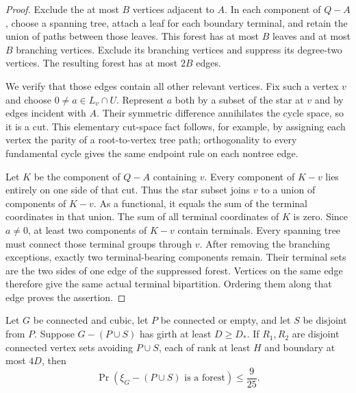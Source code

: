 \begin{proof}
Exclude the at most $B$ vertices adjacent to $A$.
In each component of $Q-A$, choose a spanning tree, attach a leaf for each boundary terminal, and retain the union of paths between those leaves.
This forest has at most $B$ leaves and at most $B$ branching vertices.
Exclude its branching vertices and suppress its degree-two vertices.
The resulting forest has at most $2B$ edges.

We verify that those edges contain all other relevant vertices.
Fix such a vertex $v$ and choose $0\ne a\in L_v\cap U$.
Represent $a$ both by a subset of the star at $v$ and by edges incident with $A$.
Their symmetric difference annihilates the cycle space, so it is a cut.
This elementary cut-space fact follows, for example, by assigning each vertex the parity of a root-to-vertex tree path; orthogonality to every fundamental cycle gives the same endpoint rule on each nontree edge.

Let $K$ be the component of $Q-A$ containing $v$.
Every component of $K-v$ lies entirely on one side of that cut.
Thus the star subset joins $v$ to a union of components of $K-v$.
As a functional, it equals the sum of the terminal coordinates in that union.
The sum of all terminal coordinates of $K$ is zero.
Since $a\ne0$, at least two components of $K-v$ contain terminals.
Every spanning tree must connect those terminal groups through $v$.
After removing the branching exceptions, exactly two terminal-bearing components remain.
Their terminal sets are the two sides of one edge of the suppressed forest.
Vertices on the same edge therefore give the same actual terminal bipartition.
Ordering them along that edge proves the assertion.
\end{proof}

\begin{lemma}
\label{lem:four-two-clean-regions}
Let $G$ be connected and cubic, let $P$ be connected or empty, and let $S$ be disjoint from $P$.
Suppose $G-(P\cup S)$ has girth at least $D\ge D_*$.
If $R_1,R_2$ are disjoint connected vertex sets avoiding $P\cup S$, each of rank at least $H$ and boundary at most $4D$, then
\[
 \Pr(\xi_G-(P\cup S)\text{ is a forest})\le\frac9{25}.
\]
\end{lemma}

